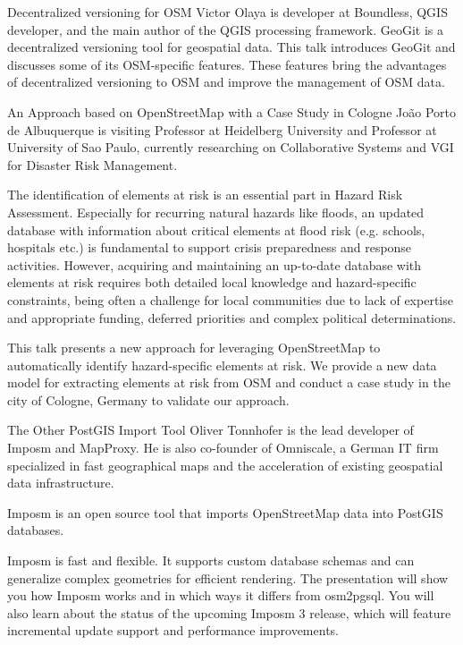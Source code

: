 
%
{Decentralized versioning for OSM}%
{Victor Olaya is developer at Boundless, QGIS developer, and the main author of the QGIS processing framework.}%
{GeoGit is a decentralized versioning tool for geospatial data. This talk introduces GeoGit and discusses some of its OSM-specific features. These features bring the advantages of decentralized versioning to OSM and improve the management of OSM data.}

%
{An Approach based on OpenStreetMap with a Case Study in Cologne}%
{João Porto de Albuquerque is visiting Professor at Heidelberg University and Professor at University of Sao Paulo, currently researching on Collaborative Systems and VGI for Disaster Risk Management. }%
{The identification of elements at risk is an essential part in Hazard Risk Assessment. Especially for recurring natural hazards like floods, an updated database with information about critical elements at flood risk (e.g. schools, hospitals etc.) is fundamental to support crisis preparedness and response activities. However, acquiring and maintaining an up-to-date database with elements at risk requires both detailed local knowledge and hazard-specific constraints, being often a challenge for local communities due to lack of expertise and appropriate funding, deferred priorities and complex political determinations.

This talk presents a new approach for leveraging OpenStreetMap to automatically identify hazard-specific elements at risk. We provide a new data model for extracting elements at risk from OSM and conduct a case study in the city of Cologne, Germany to validate our approach.}

%
{The Other PostGIS Import Tool}%
{Oliver Tonnhofer is the lead developer of Imposm and MapProxy. He is also co-founder of Omniscale, a German IT firm specialized in fast geographical maps and the acceleration of existing geospatial data infrastructure.}%
{Imposm is an open source tool that imports OpenStreetMap data into PostGIS databases.

Imposm is fast and flexible. It supports custom database schemas and can generalize complex geometries for efficient rendering.
The presentation will show you how Imposm works and in which ways it differs from osm2pgsql. You will also learn about the status of the upcoming Imposm 3 release, which will feature incremental update support and performance improvements.}

